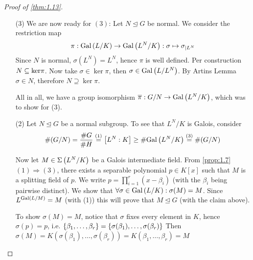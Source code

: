 \documentclass[twoside = false,	%
		headsepline,		%
		parskip = true,
		]{scrbook}						%
\begin{document}
\begin{proof}[Proof of \ref{thm:1.13}]
\begin{enumerate}
            
            \begin{claim*}{}
            $N\in\Gamma(G)$ is a normal subgroup if and only if $\sigma\round{L^N}=L^N\ \forall \sigma\in N$
            \end{claim*}
            \begin{proof}
                By plugging in the definitions we see, that $\sigma\round{L^N}=L^{\sigma N\sigma^{-1}}$
                \begin{align*}
                    \alpha\in L^{\sigma N \sigma^{-1}} &\Leftrightarrow \forall g\in N: \sigma g \sigma^{-1}(\alpha)=\alpha \\
                    &\Leftrightarrow \forall g\in N: g\sigma^{-1}(\alpha)=\sigma^{-1}(\alpha)\\
                    &\Leftrightarrow \sigma^{-1}(\alpha)\in L^N \\
                    &\Leftrightarrow \alpha\in \sigma\round{L^N}
                \end{align*}
                Now, if $N$ is normal, then $\forall \sigma\in G: L^{\sigma N \sigma^{-1}}=L^N$. Artins Lemma then gives us $$\sigma N\sigma^{-1} = \Gal{L/L^{\sigma N \sigma\inv}} = \Gal{L/L^N} = N $$
                The other direction is clear.
            \end{proof}
            \item[(3)]    
            We are now ready for $(3)$: Let $N\trianglelefteq G$ be normal. We consider the restriction map
            $$\pi: \mathrm{Gal}\left( L/K\right) \to \mathrm{Gal}\left( L^N/K\right): \sigma \mapsto \sigma_{|L^N}$$
            Since $N$ is normal, $\sigma(L^N)=L^N$, hence $\pi$ is well defined. Per construction $N\subseteq \mathrm{ker}\pi$. Now take $\sigma\in \ker\pi$, then $\sigma\in\mathrm{Gal}\left( L/L^N\right)$. By Artins Lemma $\sigma\in N$, therefore $N\supseteq \ker\pi$.
            
            All in all, we have a group isomorphism $\overline\pi:G/N\to \mathrm{Gal}\left( L^N/K\right)$, which was to show for (3).
            
            \item[(2)]
            Let $N\trianglelefteq G$ be a normal subgroup. To see that $L^N/K$ is Galois, consider
            $$\#(G/N)= \frac{\#G}{\#H}\overset{(1)}=\left[ L^N:K\right]\geq\#\mathrm{Gal}\left( L^N/K\right)\overset{(3)} = \#(G/N)$$
            
            Now let $M\in\Sigma\left( L^N/K\right)$ be a Galois intermediate field. From \ref{prop:1.7} $(1)\Rightarrow(3)$, there exists a separable polynomial $p\in K[x]$ such that $M$ is a splitting field of $p$. We write $p=\prod_{i=1}^r(x-\beta_i)$ (with the $\beta_i$ being pairwise distinct). We show that $\forall\sigma \in\mathrm{Gal}\left( L/K\right): \sigma(M)=M$. Since $L^{\mathrm{Gal}\left( L/M\right)}=M$ (with (1)) this will prove that $M\trianglelefteq G$ (with the claim above).
            
            To show $\sigma(M)=M$, notice that $\sigma$ fixes every element in $K$, hence $\sigma(p)=p$, i.e. $\left\{ \beta_1,\dots,\beta_r\right\}=\left\{ \sigma(\beta_1),\dots,\sigma(\beta_r)\right\}$
            Then $\sigma(M)=K(\sigma(\beta_1),\dots,\sigma(\beta_r))=K(\beta_1,\dots,\beta_r)=M$
        \end{enumerate}
        \end{proof}
\end{document}

